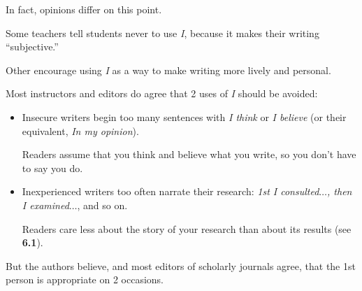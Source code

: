 \documentclass[oneside]{book}
\numberwithin{equation}{section}
\begin{document}
In fact, opinions differ on this point.

Some teachers tell students never to use \textit{I}, because it makes their writing ``subjective.''

Other encourage using \textit{I} as a way to make writing more lively and personal.

%
Most instructors and editors do agree that 2 uses of \textit{I} should be avoided:
\begin{itemize}
    \item Insecure writers begin too many sentences with \textit{I think} or \textit{I believe} (or their equivalent, \textit{In my opinion}).
    
    Readers assume that you think and believe what you write, so you don't have to say you do.
    \item Inexperienced writers too often narrate their research: \textit{1st I consulted$\ldots$, then I examined$\ldots$}, and so on.
    
    Readers care less about the story of your research than about its results (see \textbf{6.1}).
\end{itemize}
But the authors believe, and most editors of scholarly journals agree, that the 1st person is appropriate on 2 occasions.
\end{document}
